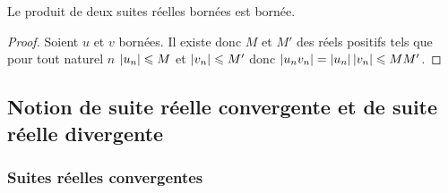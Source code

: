 \begin{prop}
  Le produit de deux suites réelles bornées est bornée.
\end{prop}
\begin{proof}
  Soient \(u\) et \(v\) bornées. Il existe donc \(M\) et \(M'\) des réels positifs tels que pour tout naturel \(n\) \(\left\lvert u_n\right\rvert\leqslant M\) et \(\left\lvert v_n\right\rvert\leqslant M'\) donc \(\left\lvert u_n v_n\right\rvert=\left\lvert u_n\right\rvert\left\lvert v_n\right\rvert\leqslant MM'\). 
\end{proof}

\subsection{Notion de suite réelle convergente et de suite réelle divergente}

\subsubsection{Suites réelles convergentes}


